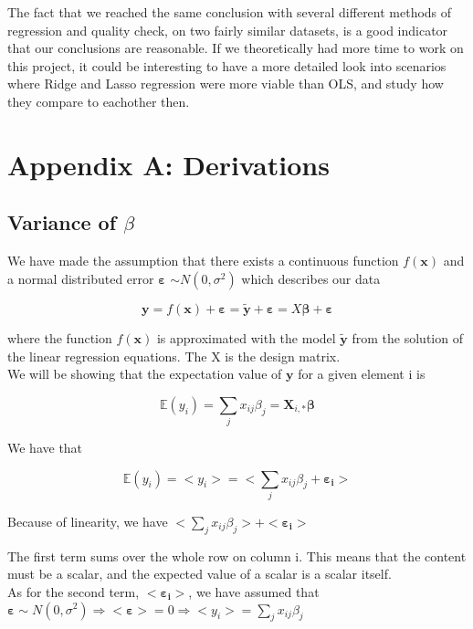\documentclass[reprint,english,notitlepage]{revtex4-1}  %
\begin{document}
The fact that we reached the same conclusion with several different methods of regression and quality check, on two fairly similar datasets, is a good indicator that our conclusions are reasonable. If we theoretically had more time to work on this project, it could be interesting to have a more detailed look into scenarios where Ridge and Lasso regression were more viable than OLS, and study how they compare to eachother then.

\section{Appendix A: Derivations}


    \subsection{Variance of $\beta$}

    We have made the assumption that there exists a continuous function $f(\mathbf{x})$ and a normal distributed error $\boldsymbol{\varepsilon}$ $\sim N(0, \sigma^2)$ which describes our data

    $$\mathbf{y} = f(\mathbf{x}) + \boldsymbol{\varepsilon} = \mathbf{\tilde{y}} + \boldsymbol{\varepsilon}= X \mathbf{\beta} + \boldsymbol{\varepsilon}$$

    where the function $f(\mathbf{x})$ is approximated with the model $\mathbf{\tilde{y}}$ from the solution of the linear regression equations. The X is the design matrix. \\


    We will be showing that the expectation value of $\mathbf{y}$ for a given element i is 


    $$\mathbb{E}(y_i) = \sum_j x_{ij} \beta_j = \mathbf{X}_{i,*} \mathbf{\beta}$$

    We have that

    $$\mathbb{E}(y_i) = <y_i> = <\sum_j x_{ij} \beta_j + \boldsymbol{\varepsilon_i}>$$

    Because of linearity, we have $<\sum_j x_{ij} \beta_j> + <\boldsymbol{\varepsilon_i}>$

    The first term sums over the whole row on column i. This means that the content must be a scalar, and the expected value of a scalar is a scalar itself. \\

    As for the second term, $<\boldsymbol{\varepsilon_i}>$, we have assumed that $\boldsymbol{\varepsilon} \sim N(0, \sigma^2) \Rightarrow <\boldsymbol{\varepsilon}> = 0 \Rightarrow <y_i> = \sum_j x_{ij} \beta_j$
\end{document}
